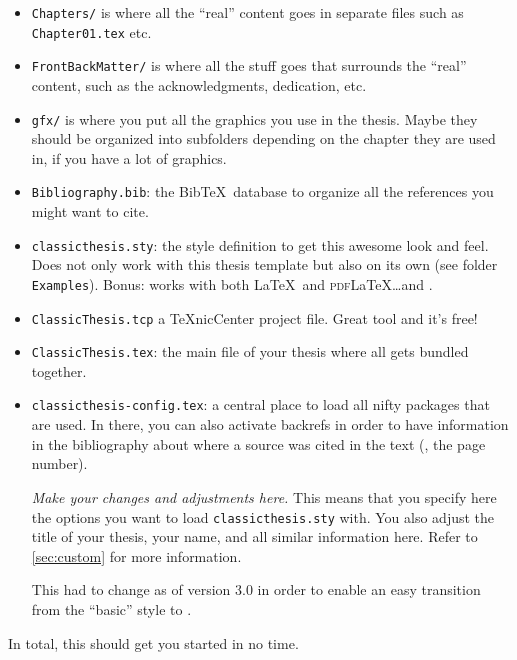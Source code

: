 \begin{itemize}
    \item\texttt{Chapters/} is where all the ``real'' content goes in
    separate files such as \texttt{Chapter01.tex} etc.
    \item\texttt{FrontBackMatter/} is where all the stuff goes that
    surrounds the ``real'' content, such as the acknowledgments,
    dedication, etc.
    \item\texttt{gfx/} is where you put all the graphics you use in
    the thesis. Maybe they should be organized into subfolders
    depending on the chapter they are used in, if you have a lot of
    graphics.
    \item\texttt{Bibliography.bib}: the Bib\TeX\ database to organize
    all the references you might want to cite.
    \item\texttt{classicthesis.sty}: the style definition to get this
    awesome look and feel. Does not only work with this thesis template
    but also on its own (see folder \texttt{Examples}). Bonus: works
    with both \LaTeX\ and \textsc{pdf}\LaTeX\dots and \mLyX.
    \item\texttt{ClassicThesis.tcp} a \TeX nicCenter project file.
    Great tool and it's free!
    \item\texttt{ClassicThesis.tex}: the main file of your thesis
    where all gets bundled together.
    \item\texttt{classicthesis-config.tex}: a central place to load all 
    nifty packages that are used. In there, you can also activate 
    backrefs in order to have information in the bibliography about 
    where a source was cited in the text (\ie, the page number).
    
    \emph{Make your changes and adjustments here.} This means that you  
    specify here the options you want to load \texttt{classicthesis.sty} 
    with. You also adjust the title of your thesis, your name, and all 
    similar information here. Refer to \autoref{sec:custom} for more 
    information.
    
		This had to change as of version 3.0 in order to enable an easy 
		transition from the ``basic'' style to \mLyX.
    
\end{itemize}
In total, this should get you started in no time.


